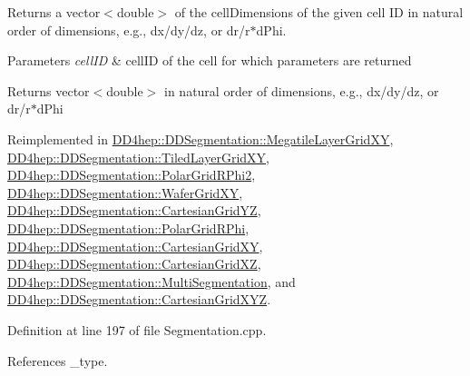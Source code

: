 Returns a vector$<$double$>$ of the cell\+Dimensions of the given cell ID in natural order of dimensions, e.\+g., dx/dy/dz, or dr/r$\ast$d\+Phi. 


\begin{DoxyParams}{Parameters}
{\em cell\+ID} & cell\+ID of the cell for which parameters are returned \\
\hline
\end{DoxyParams}
\begin{DoxyReturn}{Returns}
vector$<$double$>$ in natural order of dimensions, e.\+g., dx/dy/dz, or dr/r$\ast$d\+Phi 
\end{DoxyReturn}


Reimplemented in \hyperlink{class_d_d4hep_1_1_d_d_segmentation_1_1_megatile_layer_grid_x_y_ae5a4d3e66dc61711c51261818429fd75}{D\+D4hep\+::\+D\+D\+Segmentation\+::\+Megatile\+Layer\+Grid\+XY}, \hyperlink{class_d_d4hep_1_1_d_d_segmentation_1_1_tiled_layer_grid_x_y_af7a8796e14934f650b301f6ca0236a8d}{D\+D4hep\+::\+D\+D\+Segmentation\+::\+Tiled\+Layer\+Grid\+XY}, \hyperlink{class_d_d4hep_1_1_d_d_segmentation_1_1_polar_grid_r_phi2_a64bcce17716dee34c3f648954a1ec830}{D\+D4hep\+::\+D\+D\+Segmentation\+::\+Polar\+Grid\+R\+Phi2}, \hyperlink{class_d_d4hep_1_1_d_d_segmentation_1_1_wafer_grid_x_y_a0f578347fbddd8cc394d4663f3f6176c}{D\+D4hep\+::\+D\+D\+Segmentation\+::\+Wafer\+Grid\+XY}, \hyperlink{class_d_d4hep_1_1_d_d_segmentation_1_1_cartesian_grid_y_z_a60fd1dd0468b6edb24054f83c0e15445}{D\+D4hep\+::\+D\+D\+Segmentation\+::\+Cartesian\+Grid\+YZ}, \hyperlink{class_d_d4hep_1_1_d_d_segmentation_1_1_polar_grid_r_phi_a4d5962baf2ea8024e0b3c4f0b8d1185e}{D\+D4hep\+::\+D\+D\+Segmentation\+::\+Polar\+Grid\+R\+Phi}, \hyperlink{class_d_d4hep_1_1_d_d_segmentation_1_1_cartesian_grid_x_y_a4e6684098e023a26f7f338190c394e0e}{D\+D4hep\+::\+D\+D\+Segmentation\+::\+Cartesian\+Grid\+XY}, \hyperlink{class_d_d4hep_1_1_d_d_segmentation_1_1_cartesian_grid_x_z_adfed73ee8d0122abe3dd014e6f14cfd3}{D\+D4hep\+::\+D\+D\+Segmentation\+::\+Cartesian\+Grid\+XZ}, \hyperlink{class_d_d4hep_1_1_d_d_segmentation_1_1_multi_segmentation_a2e0625412d4b05158509a3d1e45dc1e7}{D\+D4hep\+::\+D\+D\+Segmentation\+::\+Multi\+Segmentation}, and \hyperlink{class_d_d4hep_1_1_d_d_segmentation_1_1_cartesian_grid_x_y_z_a98f90a0621c750a6bdbcdbb27468b3a1}{D\+D4hep\+::\+D\+D\+Segmentation\+::\+Cartesian\+Grid\+X\+YZ}.



Definition at line 197 of file Segmentation.\+cpp.



References \+\_\+type.



